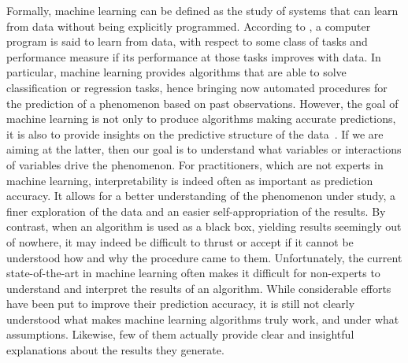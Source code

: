 Formally, machine learning can be defined as the study of systems that can
learn from data without being explicitly programmed. According to
\citet{mitchell:1997}, a computer program is said to learn from data, with
respect to some class of tasks and performance measure if its performance at
those tasks improves with data. In particular, machine learning provides
algorithms that are able to solve classification or regression tasks, hence
bringing now automated procedures for the prediction of a phenomenon based on
past observations. However, the goal of machine learning is not only to produce
algorithms making accurate predictions, it is also to provide insights on the
predictive structure of the data~\citep{breiman:1984}. If we are aiming at the
latter, then our goal is to understand what variables or interactions of
variables drive the phenomenon. For practitioners, which are not experts in
machine learning, interpretability is indeed often as important as prediction
accuracy. It allows for a better understanding of the phenomenon under study, a
finer exploration of the data and an easier self-appropriation of the results.
By contrast, when an algorithm is used as a black box, yielding results
seemingly out of nowhere, it may indeed be difficult to thrust or accept if it
cannot be understood how and why the procedure came to them. Unfortunately, the
current state-of-the-art in machine learning often makes it difficult for
non-experts to understand and interpret the results of an algorithm. While
considerable efforts have been put to improve their prediction accuracy, it is
still not clearly understood what makes machine learning algorithms truly work,
and under what assumptions. Likewise, few of them actually provide clear and
insightful explanations about the results they generate.

